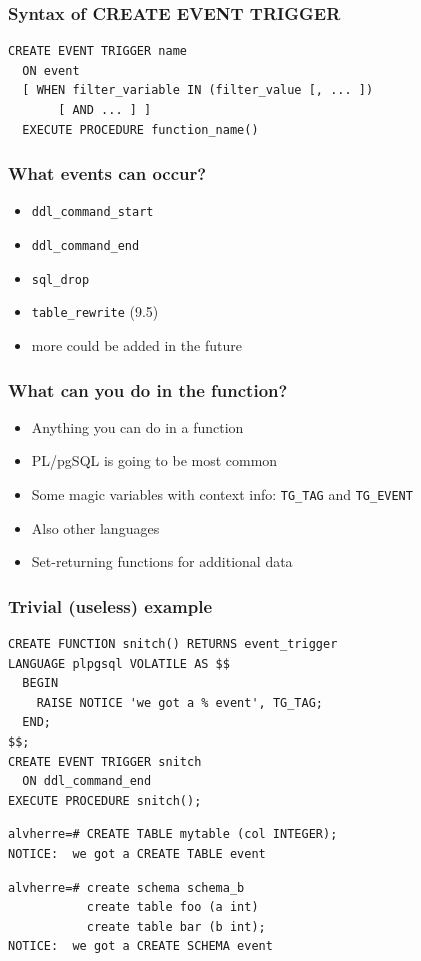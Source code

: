 \begin{frame}[fragile]
\frametitle{Syntax of CREATE EVENT TRIGGER}

\begin{lstlisting}
CREATE EVENT TRIGGER name
  ON event
  [ WHEN filter_variable IN (filter_value [, ... ])
       [ AND ... ] ]
  EXECUTE PROCEDURE function_name()
\end{lstlisting}

\end{frame}

\frame
{ \frametitle{What events can occur?}

\begin{itemize}
 \item \texttt{ddl\_command\_start}
 \item \texttt{ddl\_command\_end}
 \item \texttt{sql\_drop}
 \item \texttt{table\_rewrite} (9.5)
 \item more could be added in the future
\end{itemize}

}

\frame
{ \frametitle{What can you do in the function?}

\begin{itemize}
 \item Anything you can do in a function
 \item PL/pgSQL is going to be most common
 \item Some magic variables with context info: \texttt{TG\_TAG} and \texttt{TG\_EVENT}
 \item Also other languages
 \item Set-returning functions for additional data
\end{itemize}

}

\begin{frame}[fragile]
\frametitle{Trivial (useless) example}

\footnotesize
\lstset{language=SQL}
\begin{lstlisting}
CREATE FUNCTION snitch() RETURNS event_trigger
LANGUAGE plpgsql VOLATILE AS $$
  BEGIN
    RAISE NOTICE 'we got a % event', TG_TAG;
  END;
$$;
CREATE EVENT TRIGGER snitch
  ON ddl_command_end
EXECUTE PROCEDURE snitch();
\end{lstlisting}
\pause
\begin{lstlisting}
alvherre=# CREATE TABLE mytable (col INTEGER);
NOTICE:  we got a CREATE TABLE event
\end{lstlisting}
\pause
\begin{lstlisting}
alvherre=# create schema schema_b
           create table foo (a int)
           create table bar (b int);
NOTICE:  we got a CREATE SCHEMA event

\end{lstlisting}

\end{frame}


